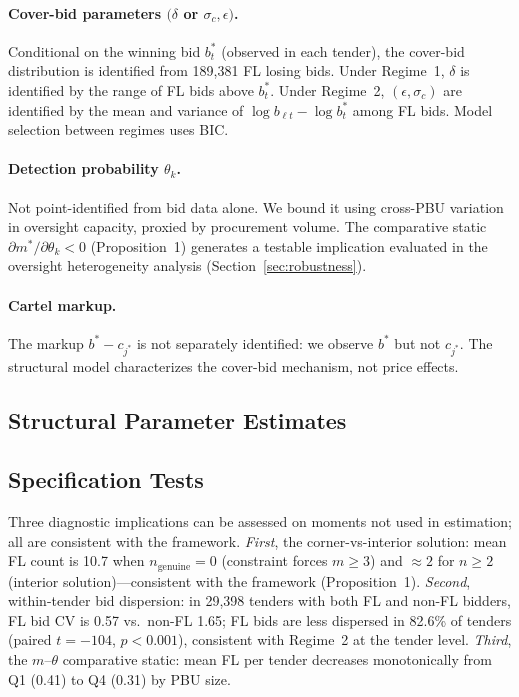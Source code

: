 \paragraph{Cover-bid parameters $(\delta$ or $\sigma_c, \epsilon)$.}
Conditional on the winning bid $b^*_t$ (observed in each tender),
the cover-bid distribution is identified from 189,381 FL losing
bids. Under Regime~1, $\delta$ is identified by the range of FL
bids above $b^*_t$. Under Regime~2, $(\epsilon, \sigma_c)$ are
identified by the mean and variance of $\log b_{\ell t} - \log b^*_t$
among FL bids. Model selection between regimes uses BIC.

\paragraph{Detection probability $\theta_k$.}
Not point-identified from bid data alone.
We bound it using cross-PBU variation in oversight capacity, proxied
by procurement volume. The comparative static $\partial m^* /
\partial \theta_k < 0$ (Proposition~1) generates
a testable implication evaluated in the oversight heterogeneity
analysis (Section~\ref{sec:robustness}).

\paragraph{Cartel markup.}
The markup $b^* - c_{j^*}$ is not separately identified: we observe
$b^*$ but not $c_{j^*}$. The structural model characterizes the
cover-bid mechanism, not price effects.

\subsection{Structural Parameter Estimates}



\subsection{Specification Tests}

Three diagnostic implications can be assessed on moments not used in estimation; all are consistent with the framework.
\emph{First}, the corner-vs-interior solution: mean FL count is 10.7
when $n_{\text{genuine}} = 0$ (constraint forces $m \geq 3$) and
$\approx 2$ for $n \geq 2$ (interior solution)---consistent with
the framework (Proposition~1).
\emph{Second}, within-tender bid dispersion: in 29,398 tenders with
both FL and non-FL bidders, FL bid CV is 0.57 vs.\ non-FL 1.65; FL
bids are less dispersed in 82.6\% of tenders (paired $t = -104$,
$p < 0.001$), consistent with Regime~2 at the tender level.
\emph{Third}, the $m$--$\theta$ comparative static: mean FL per tender
decreases monotonically from Q1 (0.41) to Q4 (0.31) by PBU size.

